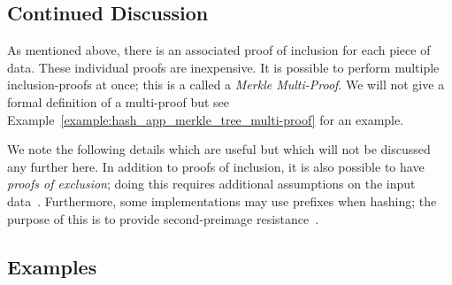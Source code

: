 


\subsection{Continued Discussion}

As mentioned above, there is an associated proof of inclusion
for each piece of data.
These individual proofs are inexpensive.
It is possible to perform multiple inclusion-proofs at once;
this is a called a \emph{Merkle Multi-Proof}.
We will not give a formal definition of a multi-proof
but see Example~\ref{example:hash_app_merkle_tree_multi-proof}
for an example.

We note the following details which are useful
but which will not be discussed any further here.
In addition to proofs of inclusion,
it is also possible to have \emph{proofs of exclusion};
doing this requires additional assumptions on the
input data~\cite{EfficientSMT}.
Furthermore, some implementations may use prefixes when hashing;
the purpose of this is to provide
second-preimage resistance~\cite{rfc6962,rfc9162}.

\subsection{Examples}

